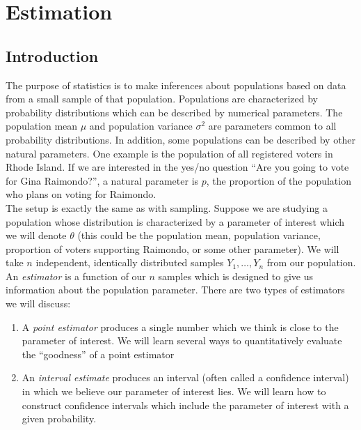 \documentclass[notes.tex]{subfiles}
\begin{document}
\setcounter{section}{5}
\section{Estimation}

\subsection{Introduction}
The purpose of statistics is to make inferences about populations based on data from a small sample of that population. Populations are characterized by probability distributions which can be described by numerical parameters. The population mean $\mu$ and population variance $\sigma^2$ are parameters common to all probability distributions. In addition, some populations can be described by other natural parameters. One example is the population of all registered voters in Rhode Island. If we are interested in the yes/no question ``Are you going to vote for Gina Raimondo?'', a natural parameter is $p$, the proportion of the population who plans on voting for Raimondo.\\

The setup is exactly the same as with sampling. Suppose we are studying a population whose distribution is characterized by a parameter of interest which we will denote $\theta$ (this could be the population mean, population variance, proportion of voters supporting Raimondo, or some other parameter). We will take $n$ independent, identically distributed samples $Y_1, \dots, Y_n$ from our population. An \emph{estimator} is a function of our $n$ samples which is designed to give us information about the population parameter. There are two types of estimators we will discuss:
\begin{enumerate}
\item A \emph{point estimator} produces a single number which we think is close to the parameter of interest. We will learn several ways to quantitatively evaluate the ``goodness'' of a point estimator
\item An \emph{interval estimate} produces an interval (often called a confidence interval) in which we believe our parameter of interest lies. We will learn how to construct confidence intervals which include the parameter of interest with a given probability.
\end{enumerate}
\end{document}
